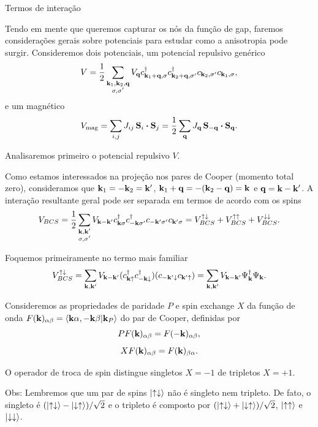 \documentclass[a4paper,10pt]{article}
\begin{document}
\begin{section}{Termos de interação}

Tendo em mente que queremos capturar os nós da função de gap, faremos considerações gerais sobre potenciais para estudar como a anisotropia pode surgir. Consideremos dois potenciais, um potencial repulsivo genérico
$$
V = \frac{1}{2} \sum_{\substack{\vb{k}_1,\vb{k}_2,\vb{q} \\ \sigma, \sigma'}} V_{\vb{q}} c_{\vb{k}_1+\vb{q},\sigma}^\dagger c_{\vb{k}_2+\vb{q},\sigma'}^\dagger c_{\vb{k}_2,\sigma'} c_{\vb{k}_1,\sigma},
$$
e um magnético
$$
V_{\text{mag}} = \sum_{i,j} J_{ij} \, \vb{S}_i \vdot \vb{S}_j = \frac{1}{2} \sum_{\q} J_{\q} \, \vb{S}_{-\q} \vdot \vb{S}_{\q}.
$$

\n

Analisaremos primeiro o potencial repulsivo $V$.



Como estamos interessados na projeção nos pares de Cooper (momento total zero), consideramos que $\vb{k}_1 = -\vb{k}_2 = \vb{k}'$, $\vb{k}_1 + \vb{q} = -(\vb{k}_2 - \vb{q}) = \vb{k}$ e $\vb{q} = \vb{k} - \vb{k}'$. A interação resultante geral pode ser separada em termos de acordo com os spins
$$
V_{BCS} = \frac{1}{2} \sum_{\substack{\vb{k},\vb{k}' \\ \sigma, \sigma'}} V_{\vb{k}-\vb{k}'} c_{\vb{k}\sigma}^\dagger c_{-\vb{k}\sigma'}^\dagger c_{-\vb{k}'\sigma'}c_{\vb{k}'\sigma} =
V_{BCS}^{\uparrow\downarrow} + V_{BCS}^{\uparrow\uparrow} + V_{BCS}^{\downarrow\downarrow}.
$$

Foquemos primeiramente no termo mais familiar
$$
V_{BCS}^{\uparrow\downarrow} = \sum_{\vb{k},\vb{k}'} V_{\vb{k}-\vb{k}'} (c_{\vb{k}\uparrow}^\dagger c_{-\vb{k}\downarrow}^\dagger) (c_{-\vb{k}'\downarrow} c_{\vb{k}'\uparrow}) =
\sum_{\vb{k},\vb{k}'} V_{\vb{k}-\vb{k}'} \Psi_{\vb{k}}^\dagger \Psi_{\vb{k}}.
$$


Consideremos as propriedades de paridade $P$ e spin exchange $X$ da função de onda $F(\vb{k})_{\alpha\beta} = \braket{\vb{k}\alpha,-\vb{k}\beta}{\vb{k}_P}$ do par de Cooper, definidas por
$$
P F(\vb{k})_{\alpha\beta} = F(-\vb{k})_{\alpha\beta},
$$
$$
X F(\vb{k})_{\alpha\beta} = F(\vb{k})_{\beta\alpha}.
$$

O operador de troca de spin distingue singletos $X = -1$ de tripletos $X = +1$.

\n

Obs: Lembremos que um par de spins $\ket{\uparrow\downarrow}$ não é singleto nem tripleto. De fato, o singleto é $(\ket{\uparrow\downarrow} - \ket{\downarrow\uparrow})/\sqrt{2}$ e o tripleto é composto por $(\ket{\uparrow\downarrow} + \ket{\downarrow\uparrow})/\sqrt{2}$, $\ket{\uparrow\uparrow}$ e $\ket{\downarrow\downarrow}$.


\end{section}
\end{document}
